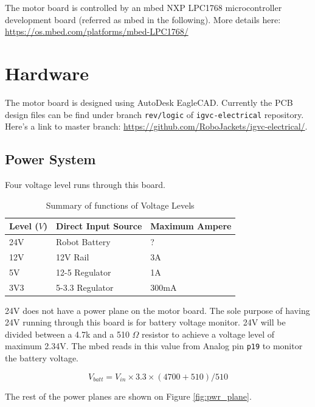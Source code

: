 \documentclass[letterpaper, 12pt]{article}
\begin{document}
The motor board is controlled by an mbed NXP LPC1768 microcontroller development board (referred as mbed in the following). More details here: \url{https://os.mbed.com/platforms/mbed-LPC1768/} \vspace{6pt}\\
\pagebreak

\section{Hardware}
The motor board is designed using AutoDesk EagleCAD. Currently the PCB design files can be find under branch \texttt{rev/logic}
of \texttt{igvc-electrical} repository. Here's a link to master branch: \url{https://github.com/RoboJackets/igvc-electrical/}.

\subsection{Power System}
Four voltage level runs through this board. 
\begin{table}[h]
    \caption{Summary of functions of Voltage Levels}
    \centering
    \begin{tabular}{p{3cm}p{4cm}p{4cm}}
    \toprule
    Level ($V$)  & Direct Input Source & Maximum Ampere \\
    \midrule
    24V  & Robot Battery & ? \\
    12V  & 12V Rail & 3A  \\
    5V  & 12-5 Regulator & 1A \\
    3V3 & 5-3.3 Regulator & 300mA \\
    \bottomrule
    \end{tabular}
\end{table}

24V does not have a power plane on the motor board. The sole purpose of having 24V running
through this board is for battery voltage monitor. 24V will be divided between a 4.7k and
a 510 $\Omega$ resistor to achieve a voltage level of maximum 2.34V. The mbed reads in this value
from Analog pin \texttt{p19} to monitor the battery voltage. 

\begin{equation}
    V_{batt} = V_{in} \times 3.3 \times (4700 + 510) / 510 
\end{equation}

\vspace{1em}The rest of the power planes are shown on Figure \ref{fig:pwr_plane}.\\
\end{document}
